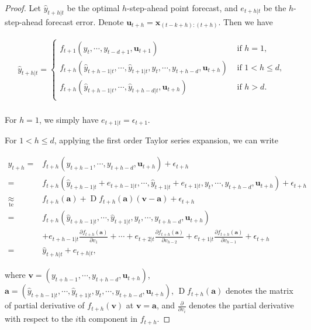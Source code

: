 \documentclass[
  11pt,
  a4paper,
]{article}
\theoremstyle{plain}
\theoremstyle{plain}
\theoremstyle{remark}
\begin{document}
\begin{proof}
Let \(\hat{y}_{t+h|t}\) be the optimal \(h\)-step-ahead point forecast,
and \(e_{t+h|t}\) be the \(h\)-step-ahead forecast error. Denote
\(\bm{u}_{t+h}=\bm{x}_{(t-k+h):(t+h)}\). Then we have

\[
\begin{aligned}
\hat{y}_{t+h|t}=\begin{cases}
      f_{t+1}\left(y_t,\cdots,y_{t-d+1},\bm{u}_{t+1}\right) & \text{ if } h=1, \\
      f_{t+h}\left(\hat{y}_{t+h-1|t},\cdots,\hat{y}_{t+1|t},y_t,\cdots,y_{t+h-d},\bm{u}_{t+h}\right) &  \text{ if } 1 < h \leq d, \\
      f_{t+h}\left(\hat{y}_{t+h-1|t},\cdots,\hat{y}_{t+h-d|t},\bm{u}_{t+h}\right) & \text{ if } h > d.\\
    \end{cases}\\
\end{aligned}
\]

For \(h=1\), we simply have \(e_{t+1|t} = \epsilon_{t+1}\).

For \(1<h\leq d\), applying the first order Taylor series expansion, we
can write

\[
\begin{aligned}
y_{t+h}
=&f_{t+h}\left(y_{t+h-1},\cdots,y_{t+h-d},\bm{u}_{t+h}\right)+\epsilon_{t+h} \\
=&f_{t+h}\left(\hat{y}_{t+h-1|t}+e_{t+h-1|t},\cdots,\hat{y}_{t+1|t}+e_{t+1|t},y_{t},\cdots,y_{t+h-d},\bm{u}_{t+h}\right)+\epsilon_{t+h} \\
\underset{\text{te}}{\approx}&f_{t+h}\left(\bm{a}\right)+\operatorname{D}f_{t+h}\left(\bm{a}\right)\left(\bm{v}-\bm{a}\right)+
\epsilon_{t+h} \\
=&f_{t+h}\left(\hat{y}_{t+h-1|t},\cdots,\hat{y}_{t+1|t},y_{t},\cdots,y_{t+h-d},\bm{u}_{t+h}\right) \\
&+e_{t+h-1|t}\frac{\partial f_{t+h}\left(\bm{a}\right)}{\partial v_1}+\cdots+e_{t+2|t}\frac{\partial f_{t+h}\left(\bm{a}\right)}{\partial v_{h-2}}+e_{t+1|t}\frac{\partial f_{t+h}\left(\bm{a}\right)}{\partial v_{h-1}}+\epsilon_{t+h} \\
=&\hat{y}_{t+h|t}+e_{t+h|t},
\end{aligned}
\]

where \(\bm{v}=\left(y_{t+h-1},\cdots,y_{t+h-d},\bm{u}_{t+h}\right)\),
\(\bm{a} =\left(\hat{y}_{t+h-1|t},\cdots,\hat{y}_{t+1|t},y_{t},\cdots,y_{t+h-d},\bm{u}_{t+h}\right)\),
\(\operatorname{D}f_{t+h}\left(\bm{a}\right)\) denotes the matrix of
partial derivative of \(f_{t+h}(\bm{v})\) at \(\bm{v}=\bm{a}\), and
\(\frac{\partial}{\partial v_i}\) denotes the partial derivative with
respect to the \(i\)th component in \(f_{t+h}\).


\end{proof}
\end{document}
